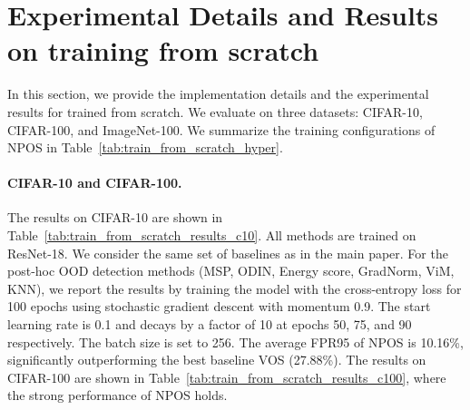 \section{Experimental Details and Results on training from scratch}
\label{sec:scratch_app}
In this section, we provide the implementation details and the experimental results for \model trained from scratch. We evaluate on three datasets: CIFAR-10, CIFAR-100, and ImageNet-100. We summarize the training configurations of NPOS in Table~\ref{tab:train_from_scratch_hyper}.

\paragraph{CIFAR-10 and CIFAR-100.}
The results on CIFAR-10 are shown in Table~\ref{tab:train_from_scratch_results_c10}. All methods are trained on ResNet-18. We consider the same set of baselines as in the main paper. For the post-hoc OOD detection methods (MSP, ODIN, Energy score, GradNorm, ViM, KNN), we report the results by training the model with the cross-entropy loss for 100 epochs using stochastic gradient descent with momentum 0.9. The start learning rate is 0.1 and decays by a factor of 10 at epochs
50, 75, and 90 respectively. The batch size is set to 256. The average FPR95 of NPOS is 10.16\%, significantly outperforming the best baseline VOS (27.88\%). The results on CIFAR-100 are shown in Table~\ref{tab:train_from_scratch_results_c100}, where the strong performance of NPOS holds.




